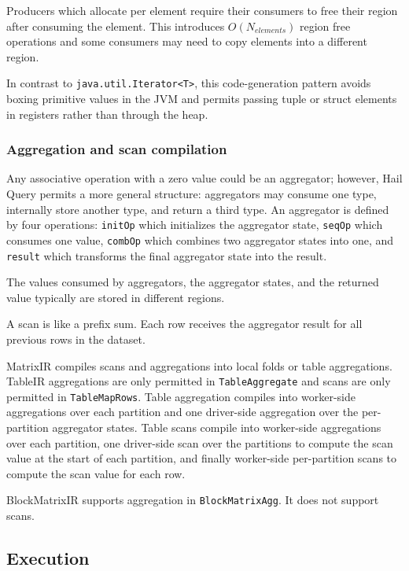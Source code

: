 \documentclass[sigconf, nonacm]{acmart}
\begin{document}
Producers which allocate per element require their consumers to free their region after consuming
the element. This introduces $O(N_{elements})$ region free operations and some consumers may need to
copy elements into a different region.

In contrast to \texttt{java.util.Iterator<T>}, this code-generation pattern avoids boxing primitive
values in the JVM and permits passing tuple or struct elements in registers rather than through the
heap.

\subsubsection{Aggregation and scan compilation}

Any associative operation with a zero value could be an aggregator; however, Hail Query permits a
more general structure: aggregators may consume one type, internally store another type, and return
a third type. An aggregator is defined by four operations: \texttt{initOp} which initializes the
aggregator state, \texttt{seqOp} which consumes one value, \texttt{combOp} which combines two
aggregator states into one, and \texttt{result} which transforms the final aggregator state into the
result.

The values consumed by aggregators, the aggregator states, and the returned value typically are
stored in different regions.

A scan is like a prefix sum. Each row receives the aggregator result for all previous rows in the
dataset.

MatrixIR compiles scans and aggregations into local folds or table aggregations. TableIR
aggregations are only permitted in \texttt{TableAggregate} and scans are only permitted in
\texttt{TableMapRows}. Table aggregation compiles into worker-side aggregations over each partition
and one driver-side aggregation over the per-partition aggregator states. Table scans compile into
worker-side aggregations over each partition, one driver-side scan over the partitions to compute
the scan value at the start of each partition, and finally worker-side per-partition scans to
compute the scan value for each row.

BlockMatrixIR supports aggregation in \texttt{BlockMatrixAgg}. It does not support scans.

\subsection{Execution}
\end{document}
